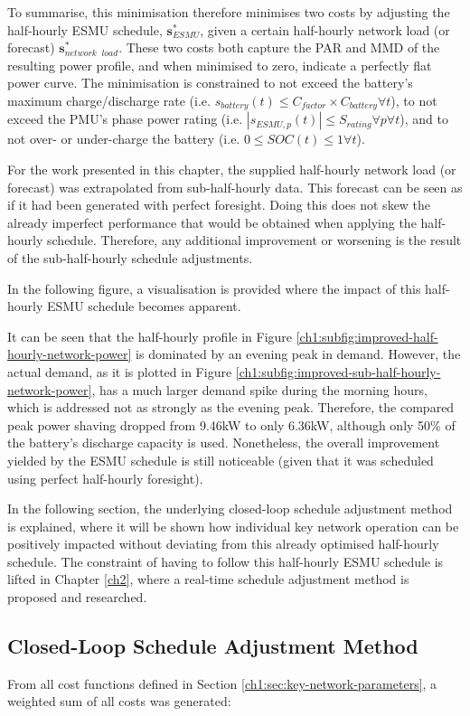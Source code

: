 

To summarise, this minimisation therefore minimises two costs by adjusting the half-hourly ESMU schedule, $\textbf{s}^*_{ESMU}$, given a certain half-hourly network load (or forecast) $\textbf{s}^*_{network\;\;load}$.
These two costs both capture the PAR and MMD of the resulting power profile, and when minimised to zero, indicate a perfectly flat power curve.
The minimisation is constrained to not exceed the battery's maximum charge/discharge rate (i.e. $s_{battery}(t) \leq C_{factor} \times C_{battery} \forall t$), to not exceed the PMU's phase power rating (i.e. $\left|s_{ESMU,p}(t)\right| \leq S_{rating} \forall p \forall t$), and to not over- or under-charge the battery (i.e. $0 \leq SOC(t) \leq 1 \forall t$).

For the work presented in this chapter, the supplied half-hourly network load (or forecast) was extrapolated from sub-half-hourly data.
This forecast can be seen as if it had been generated with perfect foresight.
Doing this does not skew the already imperfect performance that would be obtained when applying the half-hourly schedule.
Therefore, any additional improvement or worsening is the result of the sub-half-hourly schedule adjustments.

In the following figure, a visualisation is provided where the impact of this half-hourly ESMU schedule becomes apparent.



It can be seen that the half-hourly profile in Figure \ref{ch1:subfig:improved-half-hourly-network-power} is dominated by an evening peak in demand.
However, the actual demand, as it is plotted in Figure \ref{ch1:subfig:improved-sub-half-hourly-network-power}, has a much larger demand spike during the morning hours, which is addressed not as strongly as the evening peak.
Therefore, the compared peak power shaving dropped from 9.46kW to only 6.36kW, although only 50\% of the battery's discharge capacity is used.
Nonetheless, the overall improvement yielded by the ESMU schedule is still noticeable (given that it was scheduled using perfect half-hourly foresight). 

In the following section, the underlying closed-loop schedule adjustment method is explained, where it will be shown how individual key network operation can be positively impacted without deviating from this already optimised half-hourly schedule.
The constraint of having to follow this half-hourly ESMU schedule is lifted in Chapter \ref{ch2}, where a real-time schedule adjustment method is proposed and researched.

\subsection{Closed-Loop Schedule Adjustment Method}

From all cost functions defined in Section \ref{ch1:sec:key-network-parameters}, a weighted sum of all costs was generated:


